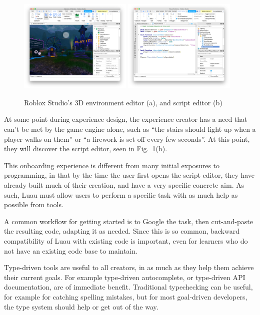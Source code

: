 \documentclass[acmsmall]{acmart}
\begin{document}
\begin{figure}
\includegraphics[width=0.48\textwidth]{studio-mow.png}
\includegraphics[width=0.48\textwidth]{studio-script-editor.png}
\caption{Roblox Studio's 3D environment editor (a), and script editor (b)}
\label{fig:studio}
\end{figure}

At some point during experience design, the experience creator has a need
that can't be met by the game engine alone, such as ``the stairs should
light up when a player walks on them'' or ``a firework is set off
every few seconds''. At this point, they will discover the script
editor, seen in Fig.~\ref{fig:studio}(b).

This onboarding experience is different from many initial exposures to
programming, in that by the time the user first opens the script
editor, they have already built much of their creation, and have a
very specific concrete aim. As such, Luau must allow users to perform a
specific task with as much help as possible from tools.

A common workflow for getting started is to Google the task, then
cut-and-paste the resulting code, adapting it as needed.  Since this
is so common, backward compatibility of Luau with existing code is
important, even for learners who do not have an existing code base to
maintain.

Type-driven tools are useful to all creators, in as much as they help
them achieve their current goals. For example type-driven
autocomplete, or type-driven API documentation, are of immediate
benefit. Traditional typechecking can be useful, for example for
catching spelling mistakes, but for most goal-driven developers, the
type system should help or get out of the way.
\end{document}
